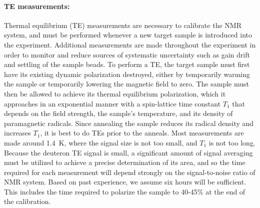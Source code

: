 \paragraph{TE measurements:}
Thermal equilibrium (TE) measurements are necessary to calibrate the NMR system,
and must be performed whenever a new target sample is introduced into the experiment.  Additional
measurements are made throughout the experiment in order to monitor and reduce sources of systematic uncertainty such as gain drift and settling of the sample beads.   
To perform a TE, the target sample must first have its existing dynamic polarization destroyed, either by temporarily warming the sample or temporarily lowering the magnetic field to zero.  The sample must then be allowed to achieve its thermal equilibrium polarization, which it approaches in an exponential manner with a spin-lattice time constant $T_1$ that depends on the field strength, the sample's temperature, and its density of paramagnetic radicals. Since annealing the sample reduces its radical density and increases $T_1$, 
it is best to do TEs prior to the anneals.  Most measurements are made around 1.4~K, where the signal size is not too small, and $T_1$ is not too long.
Because the deuteron TE signal is small, a significant amount of signal averaging must be utilized to achieve a precise determination of its area, and so the time required for each measurement will depend strongly on the signal-to-noise ratio of NMR system.  Based on past experience, we assume six hours will be sufficient.  This includes the time required to polarize the sample to 40-45\% at the end of the calibration.

\vspace{-.15in}
